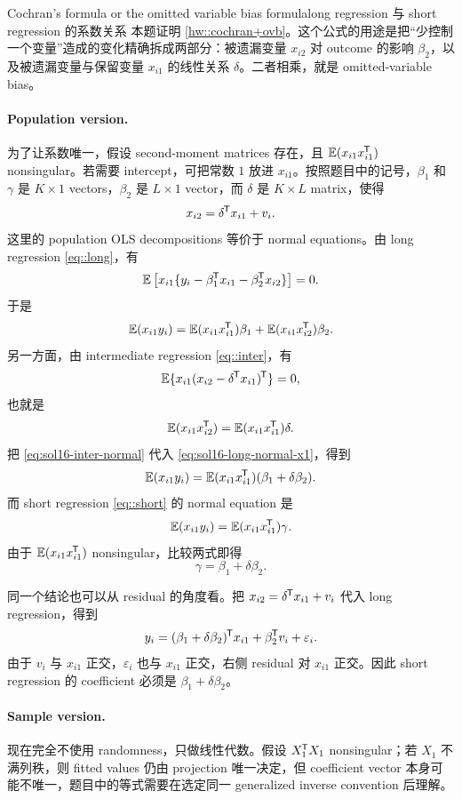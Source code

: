 \begin{exercisesolution}{Cochran's formula or the omitted variable bias formula}{long regression 与 short regression 的系数关系}
本题证明 \cref{hw::cochran+ovb}。这个公式的用途是把``少控制一个变量''造成的变化精确拆成两部分：被遗漏变量 $x_{i2}$ 对 outcome 的影响 $\beta_2$，以及被遗漏变量与保留变量 $x_{i1}$ 的线性关系 $\delta$。二者相乘，就是 omitted-variable bias。

\paragraph{Population version.}
为了让系数唯一，假设 second-moment matrices 存在，且 $\mathbb{E}(x_{i1}x_{i1}^{\mkern-1.5mu\mathsf{T}})$ nonsingular。若需要 intercept，可把常数 $1$ 放进 $x_{i1}$。按照题目中的记号，$\beta_1$ 和 $\gamma$ 是 $K\times 1$ vectors，$\beta_2$ 是 $L\times 1$ vector，而 $\delta$ 是 $K\times L$ matrix，使得
\[
x_{i2}=\delta^{\mkern-1.5mu\mathsf{T}} x_{i1}+v_i.
\]
这里的 population OLS decompositions 等价于 normal equations。由 long regression \cref{eq::long}，有
\[
\mathbb{E}\left[
x_{i1}\{y_i-\beta_1^{\mkern-1.5mu\mathsf{T}} x_{i1}-\beta_2^{\mkern-1.5mu\mathsf{T}} x_{i2}\}
\right]=0.
\]
于是
\begin{equation}
\label{eq:sol16-long-normal-x1}
\mathbb{E}(x_{i1}y_i)
=\mathbb{E}(x_{i1}x_{i1}^{\mkern-1.5mu\mathsf{T}})\beta_1
+ \mathbb{E}(x_{i1}x_{i2}^{\mkern-1.5mu\mathsf{T}})\beta_2.
\end{equation}
另一方面，由 intermediate regression \cref{eq::inter}，有
\[
\mathbb{E}\{x_{i1}(x_{i2}-\delta^{\mkern-1.5mu\mathsf{T}} x_{i1})^{\mkern-1.5mu\mathsf{T}}\}=0,
\]
也就是
\begin{equation}
\label{eq:sol16-inter-normal}
\mathbb{E}(x_{i1}x_{i2}^{\mkern-1.5mu\mathsf{T}})
=\mathbb{E}(x_{i1}x_{i1}^{\mkern-1.5mu\mathsf{T}})\delta.
\end{equation}
把 \cref{eq:sol16-inter-normal} 代入 \cref{eq:sol16-long-normal-x1}，得到
\[
\mathbb{E}(x_{i1}y_i)
=\mathbb{E}(x_{i1}x_{i1}^{\mkern-1.5mu\mathsf{T}})(\beta_1+\delta\beta_2).
\]
而 short regression \cref{eq::short} 的 normal equation 是
\[
\mathbb{E}(x_{i1}y_i)
=\mathbb{E}(x_{i1}x_{i1}^{\mkern-1.5mu\mathsf{T}})\gamma.
\]
由于 $\mathbb{E}(x_{i1}x_{i1}^{\mkern-1.5mu\mathsf{T}})$ nonsingular，比较两式即得
\[
\gamma=\beta_1+\delta\beta_2.
\]

同一个结论也可以从 residual 的角度看。把
$x_{i2}=\delta^{\mkern-1.5mu\mathsf{T}} x_{i1}+v_i$ 代入 long regression，得到
\[
y_i=(\beta_1+\delta\beta_2)^{\mkern-1.5mu\mathsf{T}} x_{i1}
+ \beta_2^{\mkern-1.5mu\mathsf{T}} v_i+\varepsilon_i.
\]
由于 $v_i$ 与 $x_{i1}$ 正交，$\varepsilon_i$ 也与 $x_{i1}$ 正交，右侧 residual 对 $x_{i1}$ 正交。因此 short regression 的 coefficient 必须是 $\beta_1+\delta\beta_2$。

\paragraph{Sample version.}
现在完全不使用 randomness，只做线性代数。假设 $X_1^{\mkern-1.5mu\mathsf{T}} X_1$ nonsingular；若 $X_1$ 不满列秩，则 fitted values 仍由 projection 唯一决定，但 coefficient vector 本身可能不唯一，题目中的等式需要在选定同一 generalized inverse convention 后理解。


\end{exercisesolution}
